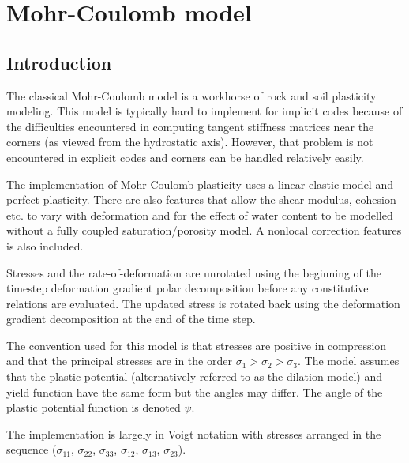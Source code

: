 \chapter{Mohr-Coulomb model}

\section{Introduction}
The classical Mohr-Coulomb model is a workhorse of rock and soil plasticity modeling.
This model is typically hard to implement for implicit codes because of the
difficulties encountered in computing tangent stiffness matrices near the corners (as viewed from the
hydrostatic axis).  However, that problem is not encountered in explicit codes and corners can be
handled relatively easily.  

The \Vaango implementation of Mohr-Coulomb plasticity uses a linear elastic model and
perfect plasticity.  There are also features that allow the shear modulus, cohesion etc. to
vary with deformation and for the effect of water content to be modelled without
a fully coupled saturation/porosity model.  A nonlocal correction features is also included.
\begin{NoteBox}
  Stresses and the rate-of-deformation are unrotated
  using the beginning of the timestep deformation gradient polar decomposition before any
  constitutive relations are evaluated.  The updated stress is rotated back using the deformation 
  gradient decomposition at the end of the time step.
  \vspace{12pt}

  The convention used for this model is that stresses are positive in compression and that the principal
  stresses are in the order $\sigma_1 > \sigma_2 > \sigma_3$.  The model assumes that the plastic potential
  (alternatively referred to as the dilation model) and yield function have the same form but the angles
  may differ.  The angle of the plastic potential function is denoted $\psi$.
  \vspace{12pt}

  The implementation is largely in Voigt notation with stresses arranged in the sequence
  ($\sigma_{11}$, $\sigma_{22}$, $\sigma_{33}$, $\sigma_{12}$, $\sigma_{13}$, $\sigma_{23}$). 
\end{NoteBox}

